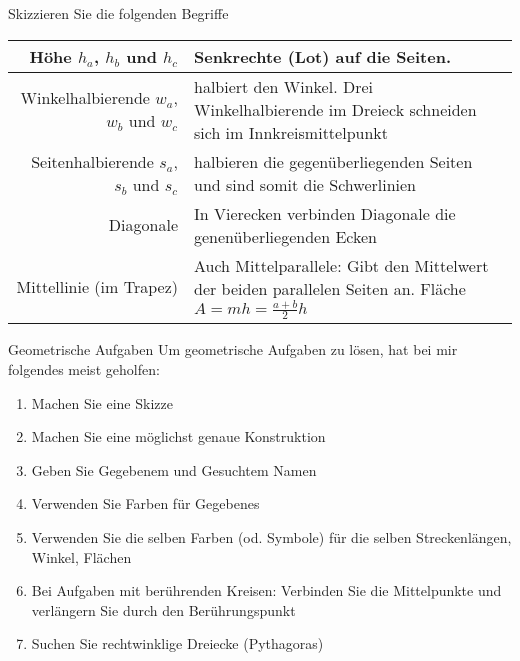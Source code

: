 Skizzieren Sie die folgenden Begriffe

\begin{tabular}{rp{90mm}}
  Höhe $h_a$, $h_b$ und $h_c$ & Senkrechte (Lot) auf die Seiten.\\\hline
  
  Winkelhalbierende $w_a$, $w_b$ und $w_c$ & halbiert den Winkel. Drei
    Winkelhalbierende im Dreieck schneiden sich im Innkreismittelpunkt\\\hline

    Seitenhalbierende $s_a$, $s_b$ und $s_c$ & halbieren die
  gegenüberliegenden Seiten und sind somit die
  Schwerlinien\index{Schwerlinie}\\\hline
  
  Diagonale & In Vierecken verbinden Diagonale die genenüberliegenden
  Ecken\\\hline

  Mittellinie (im Trapez) & Auch Mittelparallele: Gibt den Mittelwert
  der beiden parallelen Seiten an. Fläche $A = mh = \frac{a+b}2h$
\end{tabular}






\begin{rezept}{Geometrische Aufgaben}{}
Um geometrische Aufgaben zu lösen, hat bei mir folgendes meist geholfen:

\begin{enumerate}
\item Machen Sie eine Skizze
\item Machen Sie eine möglichst genaue Konstruktion
\item Geben Sie Gegebenem und Gesuchtem Namen
\item Verwenden Sie Farben für Gegebenes
\item Verwenden Sie die selben Farben (od. Symbole) für die selben Streckenlängen, Winkel, Flächen
\item Bei Aufgaben mit berührenden Kreisen: Verbinden Sie die
  Mittelpunkte und verlängern Sie durch den Berührungspunkt
\item Suchen Sie rechtwinklige Dreiecke (Pythagoras)

\end{enumerate}
\end{rezept}


